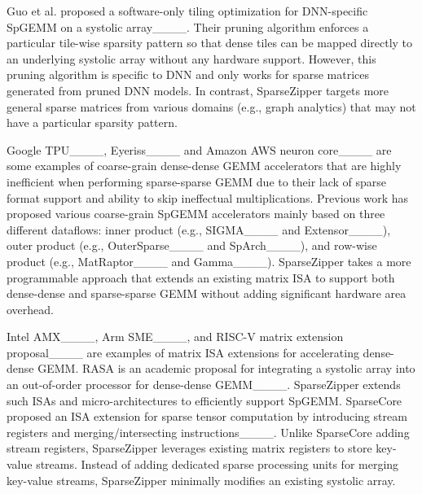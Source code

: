 Guo et al. proposed a software-only tiling optimization for DNN-specific SpGEMM
on a systolic array____.
Their pruning algorithm enforces a particular tile-wise sparsity pattern so
that dense tiles can be mapped directly to an underlying systolic array without
any hardware support.
However, this pruning algorithm is specific to DNN and only works for sparse
matrices generated from pruned DNN models.
In contrast, SparseZipper targets more general sparse matrices from various
domains (e.g., graph analytics) that may not have a particular sparsity
pattern.

Google TPU____,
Eyeriss____ and Amazon AWS neuron
core____ are some examples of coarse-grain dense-dense
GEMM accelerators that are highly inefficient when performing sparse-sparse
GEMM due to their lack of sparse format support and ability to skip ineffectual
multiplications.
Previous work has proposed various coarse-grain SpGEMM accelerators mainly
based on three different dataflows: inner product (e.g.,
SIGMA____ and Extensor____),
outer product (e.g., OuterSparse____ and
SpArch____), and row-wise product (e.g.,
MatRaptor____ and
Gamma____).
SparseZipper takes a more programmable approach that extends an existing matrix
ISA to support both dense-dense and sparse-sparse GEMM without adding
significant hardware area overhead.

Intel AMX____, Arm
SME____, and RISC-V matrix extension
proposal____ are examples of matrix ISA
extensions for accelerating dense-dense GEMM.
RASA is an academic proposal for integrating a systolic array into an
out-of-order processor for dense-dense GEMM____.
SparseZipper extends such ISAs and micro-architectures to
efficiently support SpGEMM.
SparseCore proposed an ISA extension for sparse tensor computation by
introducing stream registers and merging/intersecting
instructions____.
Unlike SparseCore adding stream registers, SparseZipper leverages existing
matrix registers to store key-value streams.
Instead of adding dedicated sparse processing units for merging key-value
streams, SparseZipper minimally modifies an existing systolic array.
